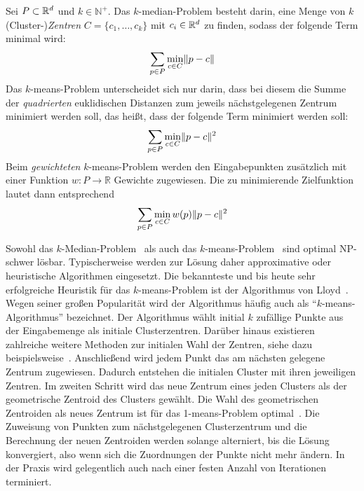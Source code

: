 \begin{definition}
\label{def:kmeans-kmedian}
Sei $P \subset \mathbb{R}^{d}$ und $k \in \mathbb{N}^{+}$. Das $k$-median-Problem besteht darin, eine Menge von $k$ (Cluster-)\emph{Zentren}
$C = \{ c_1, \dots, c_k \}$ mit $c_i \in \mathbb{R}^{d}$ zu finden, sodass der folgende Term minimal wird:
\[ \sum_{p \in P} \min_{c \in C} \lVert {p} - {c} \rVert \]
Das $k$-means-Problem unterscheidet sich nur darin, dass bei diesem die Summe der \emph{quadrierten} euklidischen Distanzen
zum jeweils nächstgelegenen Zentrum minimiert werden soll, das heißt, dass der folgende Term minimiert werden soll:
\[ \sum_{p \in P} \min_{c \in C} \lVert {p} - {c} \rVert^2 \]
Beim \emph{gewichteten} $k$-means-Problem werden den Eingabepunkten zusätzlich mit einer Funktion $w : P \rightarrow \mathbb{R}$
Gewichte zugewiesen. Die zu minimierende Zielfunktion lautet dann entsprechend
\[ \sum_{p \in P} \min_{c \in C} w(p) \lVert {p} - {c} \rVert^2 \]
\end{definition}
Sowohl das $k$-Median-Problem~\cite{MegiddoS84} als auch das $k$-means-Problem~\cite{AloiseDHP09} sind optimal NP-schwer lösbar.
Typischerweise werden zur Lösung daher approximative oder heuristische Algorithmen eingesetzt. Die bekannteste und bis
heute sehr erfolgreiche Heuristik für das $k$-means-Problem ist der Algorithmus von Lloyd~\cite{Lloyd82}. Wegen seiner
großen Popularität wird der Algorithmus häufig auch als "`$k$-means-Algorithmus"' bezeichnet.
Der Algorithmus wählt initial $k$ zufällige Punkte aus der Eingabemenge als initiale Clusterzentren. Darüber hinaus existieren
zahlreiche weitere Methoden zur initialen Wahl der Zentren, siehe dazu beispielsweise~\cite{CelebiKV13}.
Anschließend wird jedem Punkt das am nächsten gelegene Zentrum zugewiesen. Dadurch entstehen die initialen Cluster
mit ihren jeweiligen Zentren. Im zweiten Schritt wird das neue Zentrum eines jeden Clusters als der geometrische Zentroid
des Clusters gewählt.
Die Wahl des geometrischen Zentroiden als neues Zentrum ist für das 1-means-Problem optimal~\cite{OstrovskyRSS12}.
Die Zuweisung von Punkten zum nächstgelegenen Clusterzentrum und die Berechnung der neuen Zentroiden werden
solange alterniert, bis die Lösung konvergiert, also wenn sich die Zuordnungen der Punkte nicht mehr ändern. In der Praxis
wird gelegentlich auch nach einer festen Anzahl von Iterationen terminiert.

